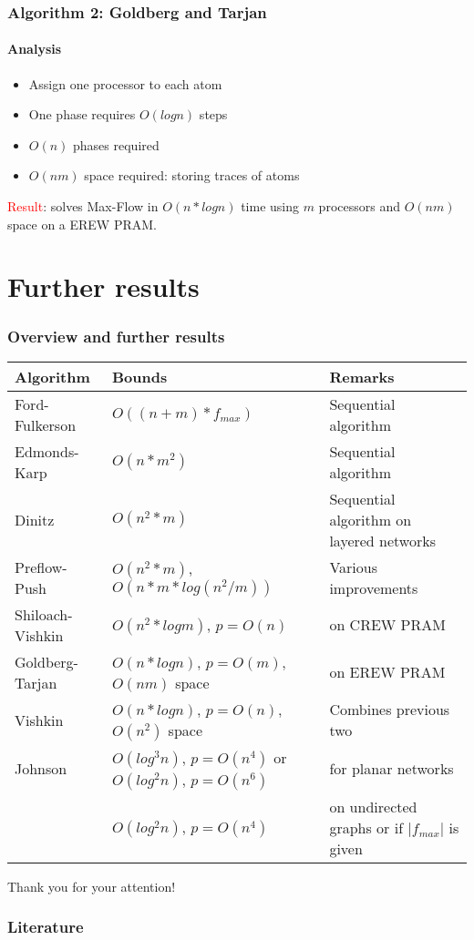 \documentclass{beamer}
\begin{document}
\begin{frame}
\frametitle{Algorithm 2: Goldberg and Tarjan}
\framesubtitle{Analysis}
\begin{itemize}
	\item Assign one processor to each atom
	\item One phase requires $O(log n)$ steps
	\item $O(n)$ phases required
	\item $O(nm)$ space required: storing traces of atoms
\end{itemize}
\pause
\textcolor{red}{Result}: solves Max-Flow in $O(n*log n)$ time using $m$ processors  and $O(nm)$ space on a EREW PRAM.
\end{frame}


\section{Further results}
\begin{frame}
\frametitle{Overview and further results}
\fontsize{8.5pt}{8}\selectfont
\begin{table}
\begin{tabularx}{\textwidth}{|X|X|X|}
\hline
Algorithm & Bounds & Remarks \\
\hline
\rowcolor{c1} Ford-Fulkerson\cite{ahuja93} & $O((n+m) * f_{max})$ & Sequential algorithm \\
\rowcolor{c2} Edmonds-Karp\cite{ahuja93} & $O(n*m^2)$ & Sequential algorithm  \\
\rowcolor{c1} Dinitz\cite{dinitz70}& $O(n^2*m)$ & Sequential algorithm on layered networks\\
\rowcolor{c2} Preflow-Push\cite{ahuja93} & $O(n^2*m)$, $O(n*m*log(n^2/m))$ & Various improvements\\
\rowcolor{c1} Shiloach-Vishkin\cite{yossi81} & $O(n^2*log m)$, $p=O(n)$ & on CREW PRAM\\
\rowcolor{c2} Goldberg-Tarjan\cite{goldberg89} & $O(n*log n)$, $p=O(m)$, $O(nm)$ space & on EREW PRAM \\
\rowcolor{c1} Vishkin\cite{vishkin92} & $O(n*log n)$, $p=O(n)$, $O(n^2)$ space & Combines previous two\\
\rowcolor{c2} Johnson\cite{johnson87} & $O(log^{3} n)$, $p=O(n^{4})$ or $O(log^{2} n)$, $p=O(n^{6})$ &
for planar networks\\
\rowcolor{c2} & $	O(log^{2} n)$, $p=O(n^{4})$ & on undirected graphs or if  $\lvert f_{max} \rvert$ is given\\
\hline
\end{tabularx}
\end{table}
\end{frame}

\begin{frame}
Thank you for your attention!
\end{frame}

\begin{frame}[allowframebreaks]
\frametitle<presentation>{Literature}    
\printbibliography
\end{frame} 	 
\end{document}
